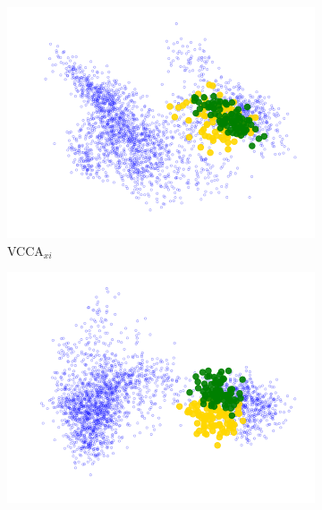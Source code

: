 

\begin{figure}[t]
     \centering
     \begin{subfigure}[b]{0.3\textwidth}
         \centering
         \includegraphics[width=\textwidth]{figures_and_tables/latent_space_visualizations/juice_yoghurt_new/pca_latent_juice_yoghurt_vcca_xi_seed2.png}
         \caption{VCCA$_{x i}$}
         \label{fig:pca_vcca_xi_juice_yoghurt}
     \end{subfigure} 
     \begin{subfigure}[b]{0.3\textwidth}
         \centering
         \includegraphics[width=\textwidth]{figures_and_tables/latent_space_visualizations/juice_yoghurt_new/pca_latent_juice_yoghurt_vcca_xw_seed2.png}

\end{subfigure}
\end{figure}
